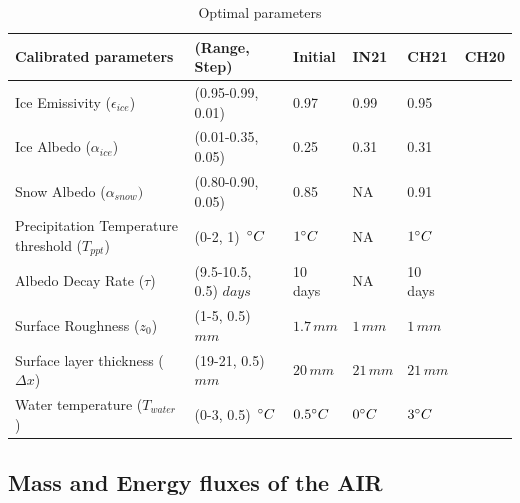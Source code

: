\documentclass[utf8]{frontiersSCNS} %
\begin{document}
\begin{table}[]
\centering
\caption{Optimal parameters}
\label{tab:parameters}
\begin{tabular}{@{}llllll@{}}
\toprule
\textbf{Calibrated parameters} & \textbf{(Range, Step)}                                & \textbf{Initial} & \textbf{IN21} & \textbf{CH21} & \textbf{CH20} \\\midrule
Ice Emissivity ($\epsilon_{ice}$)               & (0.95-0.99, 0.01)                    & 0.97        & 0.99  & 0.95 &  \\
Ice Albedo ($\alpha_{ice}$)                     & (0.01-0.35, 0.05)                    & 0.25        & 0.31  & 0.31 &  \\
Snow Albedo ($\alpha_{snow})$                   & (0.80-0.90, 0.05)                    & 0.85        & NA  & 0.91 &  \\
Precipitation Temperature threshold ($T_{ppt}$) & (0-2, 1) $\,\degree C$               & $1\degree C$& NA & $1\degree C$ &  \\
Albedo Decay Rate ($\tau$)                      & (9.5-10.5, 0.5) $days$               & 10 days     & NA      & 10 days  &  \\
Surface Roughness ($z_0$)                       & (1-5, 0.5) $mm$                        & $1.7\,mm$   & $1\,mm$ & $1\,mm$ &  \\ 
Surface layer thickness ($\Delta x$)            & (19-21, 0.5) $mm$                    & $20\,mm$    & $21\,mm$ & $21\,mm$ &  \\
Water temperature ($T_{water}$)                 & (0-3, 0.5) $\,\degree C$             & $0.5\degree C$&$0\degree C$&$3\degree C$&\\\bottomrule
\end{tabular}
\end{table}

\subsection{Mass and Energy fluxes of the AIR}

% 
\end{document}
